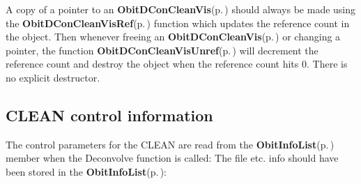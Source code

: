A copy of a pointer to an {\bf Obit\-DCon\-Clean\-Vis}{\rm (p.\,\pageref{structObitDConCleanVis})} should always be made using the {\bf Obit\-DCon\-Clean\-Vis\-Ref}{\rm (p.\,\pageref{ObitDConCleanVis_8h_a1})} function which updates the reference count in the object. Then whenever freeing an {\bf Obit\-DCon\-Clean\-Vis}{\rm (p.\,\pageref{structObitDConCleanVis})} or changing a pointer, the function {\bf Obit\-DCon\-Clean\-Vis\-Unref}{\rm (p.\,\pageref{ObitDConCleanVis_8h_a0})} will decrement the reference count and destroy the object when the reference count hits 0. There is no explicit destructor. \subsection{CLEAN control information}\label{ObitDConCleanVis_8h_ObitDConCleanViscontrol}
The control parameters for the CLEAN are read from the {\bf Obit\-Info\-List}{\rm (p.\,\pageref{structObitInfoList})} member when the Deconvolve function is called: The file etc. info should have been stored in the {\bf Obit\-Info\-List}{\rm (p.\,\pageref{structObitInfoList})}: \begin{itemize}

\end{itemize}
